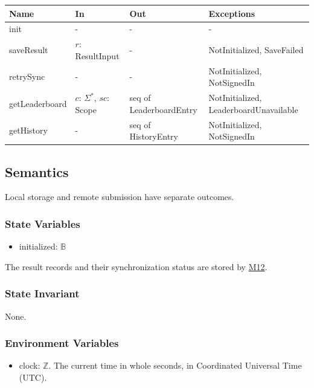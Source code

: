 \documentclass[12pt, titlepage]{article}
\newcommand{\Mref}[1]{\hyperref[sec:M#1]{M#1}}
\begin{document}
\begin{center}
\begin{minipage}{\textwidth}
\begin{tabularx}{\textwidth}{p{3cm} p{3.2cm} p{3.4cm} X}
\toprule
\textbf{Name} & \textbf{In} & \textbf{Out} & \textbf{Exceptions} \\
\midrule
init & - & - & - \\
saveResult & $r$: ResultInput & - & NotInitialized, SaveFailed \\
retrySync & - & - & NotInitialized, NotSignedIn \\
getLeaderboard & $c$: $\Sigma^*$, $sc$: Scope & seq of LeaderboardEntry &
NotInitialized, LeaderboardUnavailable \\
getHistory & - & seq of HistoryEntry & NotInitialized, NotSignedIn \\
\bottomrule
\end{tabularx}
\label{TblM10Access}
\end{minipage}
\end{center}

\subsection{Semantics}

Local storage and remote submission have separate outcomes.

\subsubsection{State Variables}

\begin{itemize}
\item initialized: $\mathbb{B}$
\end{itemize}

The result records and their synchronization status are stored by \Mref{12}.

\subsubsection{State Invariant}

None.

\subsubsection{Environment Variables}

\begin{itemize}
\item clock: $\mathbb{Z}$. The current time in whole seconds, in Coordinated
  Universal Time (UTC).
\end{itemize}
\end{document}

